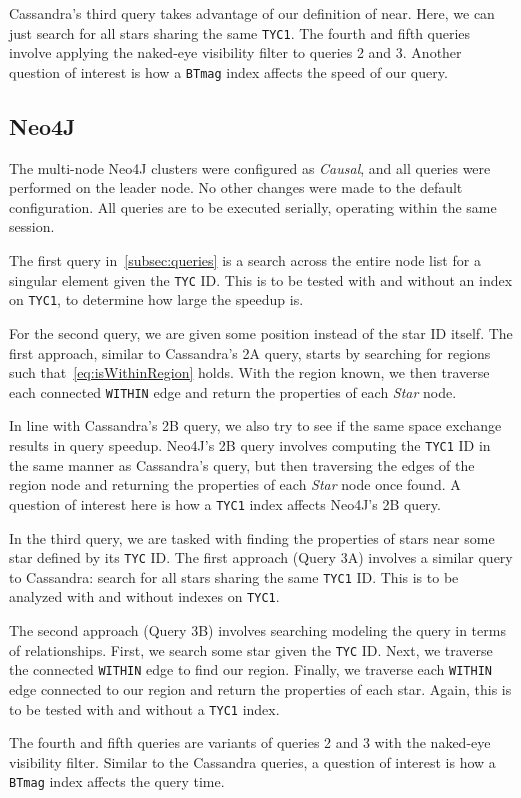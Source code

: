 Cassandra's third query takes advantage of our definition of near.
Here, we can just search for all stars sharing the same \texttt{TYC1}.
The fourth and fifth queries involve applying the naked-eye visibility filter to queries 2 and 3.
Another question of interest is how a \texttt{BTmag} index affects the speed of our query.

\subsection{Neo4J}\label{subsec:neo4j}
The multi-node Neo4J clusters were configured as \textit{Causal}, and all queries were performed on
the leader node.
No other changes were made to the default configuration.
All queries are to be executed serially, operating within the same session.

The first query in~\autoref{subsec:queries} is a search across the entire node list for a singular element given the
\texttt{TYC} ID\@.
This is to be tested with and without an index on \texttt{TYC1}, to determine how large the speedup is.

For the second query, we are given some position instead of the star ID itself.
The first approach, similar to Cassandra's 2A query, starts by searching for regions such
that~\autoref{eq:isWithinRegion} holds.
With the region known, we then traverse each connected \texttt{WITHIN} edge and return the properties of each
\textit{Star} node.

In line with Cassandra's 2B query, we also try to see if the same space exchange results in query speedup.
Neo4J's 2B query involves computing the \texttt{TYC1} ID in the same manner as Cassandra's query, but
then traversing the edges of the region node and returning the properties of each \textit{Star} node once found.
A question of interest here is how a \texttt{TYC1} index affects Neo4J's 2B query.

In the third query, we are tasked with finding the properties of stars near some star defined by its \texttt{TYC} ID\@.
The first approach (Query 3A) involves a similar query to Cassandra: search for all stars sharing the same
\texttt{TYC1} ID\@.
This is to be analyzed with and without indexes on \texttt{TYC1}.

The second approach (Query 3B) involves searching modeling the query in terms of relationships.
First, we search some star given the \texttt{TYC} ID\@.
Next, we traverse the connected \texttt{WITHIN} edge to find our region.
Finally, we traverse each \texttt{WITHIN} edge connected to our region and return the properties of each star.
Again, this is to be tested with and without a \texttt{TYC1} index.

The fourth and fifth queries are variants of queries 2 and 3 with the naked-eye visibility filter.
Similar to the Cassandra queries, a question of interest is how a \texttt{BTmag} index affects the query time.
